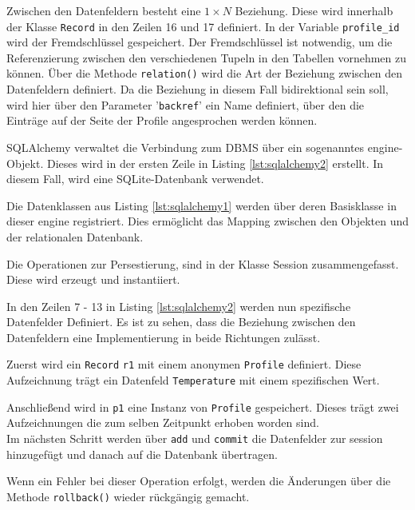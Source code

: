     Zwischen den Datenfeldern besteht eine $1 \times N$ Beziehung. Diese wird innerhalb der Klasse \texttt{Record} in den Zeilen 16 und 17 definiert.  In der Variable \texttt{profile\_id} wird der Fremdschlüssel gespeichert. Der Fremdschlüssel ist notwendig, um die Referenzierung zwischen den verschiedenen Tupeln in den Tabellen vornehmen zu können. Über die Methode \texttt{relation()} wird die Art der Beziehung zwischen den Datenfeldern definiert. Da die Beziehung in diesem Fall bidirektional sein soll, wird hier über den Parameter '\texttt{backref}' ein Name definiert, über den die Einträge auf der Seite der Profile angesprochen werden können.
    
    
        
    SQLAlchemy verwaltet die Verbindung zum DBMS über ein sogenanntes engine-Objekt. Dieses wird in der ersten Zeile in Listing \ref{lst:sqlalchemy2} erstellt. In diesem Fall, wird eine SQLite-Datenbank verwendet.
    
    Die Datenklassen aus Listing \ref{lst:sqlalchemy1} werden über deren Basisklasse in dieser engine registriert. Dies ermöglicht das Mapping zwischen den Objekten und der relationalen Datenbank.
    
    Die Operationen zur Persestierung, sind in der Klasse Session zusammengefasst. Diese wird erzeugt und instantiiert. 
    
    In den Zeilen 7 - 13 in Listing \ref{lst:sqlalchemy2} werden nun spezifische Datenfelder Definiert. Es ist zu sehen, dass die Beziehung zwischen den Datenfeldern eine Implementierung in beide Richtungen zulässt.
    
    Zuerst wird ein \texttt{Record} \texttt{r1} mit einem anonymen \texttt{Profile} definiert. Diese Aufzeichnung trägt ein Datenfeld \texttt{Temperature} mit einem spezifischen Wert.
    
    Anschließend wird in \texttt{p1} eine Instanz von \texttt{Profile} gespeichert. Dieses trägt zwei Aufzeichnungen die zum selben Zeitpunkt erhoben worden sind.
    \\
    
    Im nächsten Schritt werden über \texttt{add} und \texttt{commit} die Datenfelder zur session hinzugefügt und danach auf die Datenbank übertragen.
    
    Wenn ein Fehler bei dieser Operation erfolgt, werden die Änderungen über die Methode \texttt{rollback()} wieder rückgängig gemacht.

    
    
